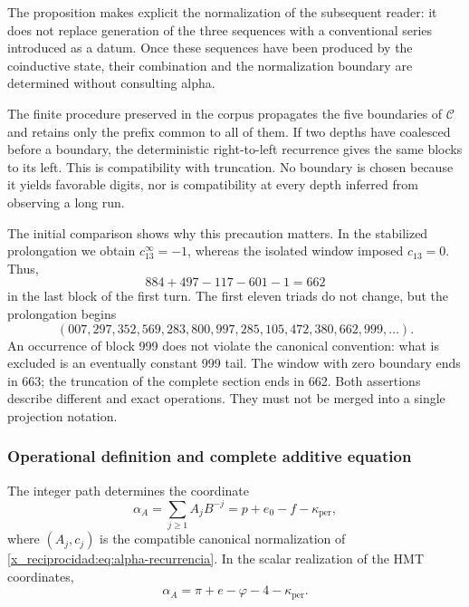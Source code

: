 The proposition makes explicit the normalization of the subsequent reader: it does not
replace generation of the three sequences with a conventional series
introduced as a datum. Once these sequences have been produced by the coinductive
state, their combination and the normalization boundary are
determined without consulting alpha.

The finite procedure preserved in the corpus propagates the five
boundaries of \(\mathcal C\) and retains only the prefix common to
all of them. If two depths have coalesced before a boundary,
the deterministic right-to-left recurrence gives the same blocks
to its left. This is compatibility with truncation. No
boundary is chosen because it yields favorable digits, nor is compatibility
at every depth inferred from observing a long run.

The initial comparison shows why this precaution matters. In the
stabilized prolongation we obtain \(c_{13}^{\infty}=-1\), whereas
the isolated window imposed \(c_{13}=0\). Thus,
\[
 884+497-117-601-1=662
\]
in the last block of the first turn. The first eleven triads do not
change, but the prolongation begins
\[
 (007,297,352,569,283,800,997,285,105,472,380,662,999,\ldots).
\]
An occurrence of block 999 does not violate the canonical convention: what is
excluded is an eventually constant 999 tail. The window with
zero boundary ends in 663; the truncation of the complete section
ends in 662. Both assertions describe different and exact
operations. They must not be merged into a single projection notation.

\subsubsection{Operational definition and complete additive equation}
\label{x_reciprocidad:subsec:alpha-definicion}

\begin{definition}
\label{x_reciprocidad:def:alpha-operativa}
The integer path determines the coordinate
\begin{equation}
 \alpha_A=\sum_{j\geq1}A_jB^{-j}
 =p+e_0-f-\kappa_{\mathrm{per}},
 \label{x_reciprocidad:eq:alpha-via-a}
\end{equation}
where \((A_j,c_j)\) is the compatible canonical normalization of
\eqref{x_reciprocidad:eq:alpha-recurrencia}. In the scalar realization of the
HMT coordinates,
\begin{equation}
 \boxed{\alpha_A=
 \pi+e-\varphi
 -4-\kappa_{\mathrm{per}}.}
 \label{x_reciprocidad:eq:alpha-identidad-completa}
\end{equation}
\end{definition}

